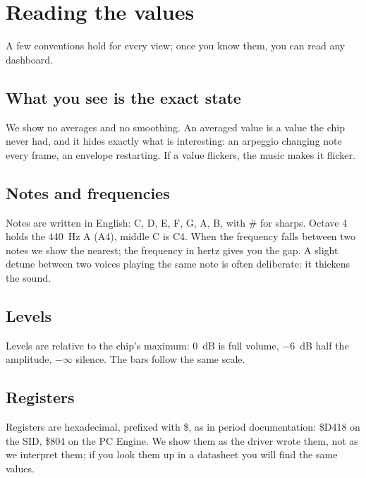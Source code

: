 \chapter{Reading the values}

A few conventions hold for every view; once you know them, you can read any dashboard.

\section{What you see is the exact state}
We show no averages and no smoothing. An averaged value is a value the chip never had, and it hides exactly what is
interesting: an arpeggio changing note every frame, an envelope restarting. If a value flickers, the music makes it
flicker.

\section{Notes and frequencies}
Notes are written in English: C, D, E, F, G, A, B, with \# for sharps. Octave 4 holds the 440~Hz A (A4), middle C
is C4. When the frequency falls between two notes we show the nearest; the frequency in hertz gives you the gap. A
slight detune between two voices playing the same note is often deliberate: it thickens the sound.

\section{Levels}
Levels are relative to the chip's maximum: 0~dB is full volume, $-6$~dB half the amplitude, $-\infty$ silence. The
bars follow the same scale.

\section{Registers}
Registers are hexadecimal, prefixed with \$, as in period documentation: \$D418 on the SID, \$804 on the PC Engine.
We show them as the driver wrote them, not as we interpret them; if you look them up in a datasheet you will find the
same values.
